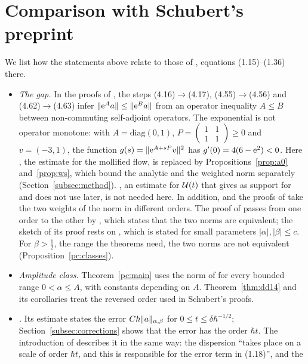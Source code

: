 \section{Comparison with Schubert's preprint}\label{sec:changes}
We list how the statements above relate to those of \cite{S}, equations (1.15)--(1.36) there.
\begin{itemize}
\item \emph{The gap.} In the proofs of \cite[Theorems~4.1 and~4.4]{S}, the steps (4.16)$\to$(4.17), (4.55)$\to$(4.56) and
(4.62)$\to$(4.63) infer $\lVert \mathrm{e}^{A}a\rVert\le\lVert \mathrm{e}^{B}a\rVert$ from an operator inequality $A\le B$ between non-commuting
self-adjoint operators. The exponential is not operator monotone: with $A=\mathrm{diag}(0,1)$,
$P=\begin{pmatrix}1&1\\1&1\end{pmatrix}\ge0$ and $v=(-3,1)$, the function $g(s)=\lVert \mathrm{e}^{A+sP}v\rVert^2$ has
$g'(0)=4(6-\mathrm{e}^2)<0$. Here \cite[Theorem~4.4]{S}, the estimate for the mollified flow, is replaced by
Propositions~\ref{prop:a0} and~\ref{prop:ws}, which bound the analytic and the weighted norm separately
(Section~\ref{subsec:method}). \cite[Theorem~4.1]{S}, an estimate for $\mathcal{U}(t)$ that \cite{S} gives as support for
\cite[Conjecture~1]{S} and does not use later, is not needed here. In addition, \cite[Def.~1.1]{S} and the proofs of \cite[Prop.~3.5, Lemma~3.11]{S} take the two weights
of the norm in different orders. The proof of \cite[Lemma~3.11]{S} passes from one order to the other by
\cite[Proposition~7.1, (7.2)]{S}, which states that the two norms are equivalent; the sketch of its proof rests on
\cite[Theorem~7.2]{S}, which is stated for small parameters $|\alpha|,|\beta|\le c$. For $\beta>\tfrac12$, the range the theorems
need, the two norms are not equivalent (Proposition~\ref{pc:classes}).
\item \emph{Amplitude class.} Theorem~\ref{pc:main} uses the norm of \cite[Def.~1.1]{S} for every bounded range $0<\alpha\le A$, with constants depending on $A$.
Theorem~\ref{thm:dd14} and its corollaries treat the reversed order used in Schubert's proofs.
\item \emph{\cite[Theorem~1.3]{S}.} Its estimate \cite[(1.18)--(1.19)]{S} states the error $C\hbar\lVert a\rVert_{\alpha,\beta}$ for $0\le t\le\delta\hbar^{-1/2}$;
Section~\ref{subsec:corrections} shows that the error has the order $\hbar t$. The introduction of \cite{S} describes it in the same
way: the dispersion ``takes place on a scale of order $\hbar t$, and this is responsible for the error term in (1.18)'', and the

\end{itemize}

